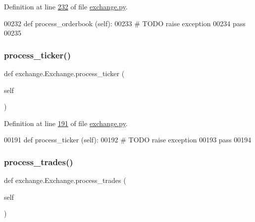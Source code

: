 Definition at line \hyperlink{exchange_8py_source_l00232}{232} of file \hyperlink{exchange_8py_source}{exchange.\+py}.


\begin{DoxyCode}
00232     \textcolor{keyword}{def }process\_orderbook (self):
00233         \textcolor{comment}{# TODO raise exception}
00234         \textcolor{keywordflow}{pass}
00235     
\end{DoxyCode}
\mbox{\label{classexchange_1_1_exchange_aa3f83a45154aa4a1b07010f74c2b37db}} 
\subsubsection{\texorpdfstring{process\+\_\+ticker()}{process\_ticker()}}
{\footnotesize\ttfamily def exchange.\+Exchange.\+process\+\_\+ticker (\begin{DoxyParamCaption}\item[{}]{self }\end{DoxyParamCaption})}



Definition at line \hyperlink{exchange_8py_source_l00191}{191} of file \hyperlink{exchange_8py_source}{exchange.\+py}.


\begin{DoxyCode}
00191     \textcolor{keyword}{def }process\_ticker (self):
00192         \textcolor{comment}{# TODO raise exception}
00193         \textcolor{keywordflow}{pass}
00194     
\end{DoxyCode}
\mbox{\label{classexchange_1_1_exchange_a0e67454c7053807302be914376790484}} 
\subsubsection{\texorpdfstring{process\+\_\+trades()}{process\_trades()}}
{\footnotesize\ttfamily def exchange.\+Exchange.\+process\+\_\+trades (\begin{DoxyParamCaption}\item[{}]{self }\end{DoxyParamCaption})}



